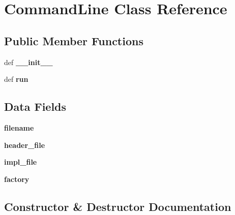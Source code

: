 \section{\-Command\-Line \-Class \-Reference}
\label{classevent__rpcgen_1_1_command_line}
\subsection*{\-Public \-Member \-Functions}
\begin{DoxyCompactItemize}
\item 
def {\bf \-\_\-\-\_\-init\-\_\-\-\_\-}
\item 
def {\bfseries run}\label{classevent__rpcgen_1_1_command_line_aedcaade7dd45761ddcc3b3cc07005314}

\end{DoxyCompactItemize}
\subsection*{\-Data \-Fields}
\begin{DoxyCompactItemize}
\item 
{\bfseries filename}\label{classevent__rpcgen_1_1_command_line_a2ff994e16bf9521154de4cf659a3b689}

\item 
{\bfseries header\-\_\-file}\label{classevent__rpcgen_1_1_command_line_a90aeef8912cb45d1621e0a7af3968669}

\item 
{\bfseries impl\-\_\-file}\label{classevent__rpcgen_1_1_command_line_a5fa73d9604778c002ca0823bb19f20bb}

\item 
{\bfseries factory}\label{classevent__rpcgen_1_1_command_line_a8e69d9f53088b7b0931fda54cb5ede70}

\end{DoxyCompactItemize}


\subsection{\-Constructor \& \-Destructor \-Documentation}
